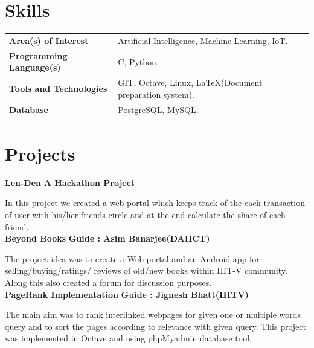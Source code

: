 \documentclass{article}
\begin{document}
\vspace*{.4cm}
\section{Skills}
\vspace*{2mm}
\begin{tabular}{ll}
\textbf{Area(s) of Interest} & Artificial Intelligence, Machine Learning, IoT.\\
\textbf{Programming Language(s)}&C, Python.\\
\textbf{Tools and Technologies} & GIT, Octave, Linux, \LaTeX(Document preparation system).\\
\textbf{Database} & PostgreSQL, MySQL.\\
\end{tabular}

\vspace*{.5cm}
\section{Projects}
\vspace*{2mm}
\textbf{\large{Len-Den}} \hspace*{13cm} \textbf{A Hackathon Project}

\vspace*{.031mm}
\hspace*{2.6mm}
In this project we created a web portal which keeps track of the each transaction of user with his/her friends circle and at the end calculate the share of each friend.\\

\vspace*{2mm}
\textbf{\large{Beyond Books}} \hspace*{9.5cm} \textbf{Guide : Asim Banarjee(DAIICT)}

\vspace*{.031mm}
\hspace*{2.6mm} The project idea was to create a Web portal and an Android app for selling/buying/ratings/ reviews of old/new books within IIIT-V community. Along this also created a forum for discussion purposes.\\

\vspace*{2mm}
\textbf{\large{PageRank Implementation}} \hspace*{7.8cm} \textbf{Guide : Jignesh Bhatt(IIITV)}

\vspace*{.031mm}
\hspace*{2.6mm} The main aim was to rank interlinked webpages for given one or multiple words query and to sort the pages according to relevance with given query. This project was implemented in Octave and using phpMyadmin database tool.\\
\end{document}
